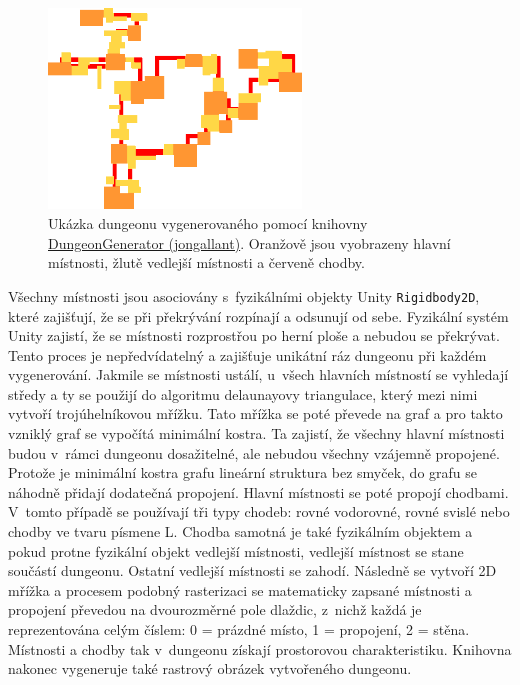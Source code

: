 \begin{figure}[t]
    \centering
    \includegraphics[width=0.6\textwidth]{obrazky/dunglib_jongallant.png}
    \caption{Ukázka dungeonu vygenerovaného pomocí knihovny \href{https://github.com/jongallant/DungeonGenerator}{DungeonGenerator (jongallant)}. Oranžově jsou vyobrazeny hlavní místnosti, žlutě vedlejší místnosti a červeně chodby.}
    \label{img:dunglib_jongallant}
\end{figure}
Všechny místnosti jsou asociovány s~fyzikálními objekty Unity \texttt{Rigidbody2D}, které zajišťují, že se při překrývání rozpínají a odsunují od sebe.
Fyzikální systém Unity zajistí, že se místnosti rozprostřou po herní ploše a nebudou se překrývat.
Tento proces je nepředvídatelný a zajišťuje unikátní ráz dungeonu při každém vygenerování.
Jakmile se místnosti ustálí, u~všech hlavních místností se vyhledají středy a ty se použijí do algoritmu delaunayovy triangulace, který mezi nimi vytvoří trojúhelníkovou mřížku.
Tato mřížka se poté převede na graf a pro takto vzniklý graf se vypočítá minimální kostra.
Ta zajistí, že všechny hlavní místnosti budou v~rámci dungeonu dosažitelné, ale nebudou všechny vzájemně propojené.
Protože je minimální kostra grafu lineární struktura bez smyček, do grafu se náhodně přidají dodatečná propojení.
Hlavní místnosti se poté propojí chodbami.
V~tomto případě se používají tři typy chodeb: rovné vodorovné, rovné svislé nebo chodby ve tvaru písmene L.
Chodba samotná je také fyzikálním objektem a pokud protne fyzikální objekt vedlejší místnosti, vedlejší místnost se stane součástí dungeonu.
Ostatní vedlejší místnosti se zahodí.
Následně se vytvoří 2D mřížka a procesem podobný rasterizaci se matematicky zapsané místnosti a propojení převedou na dvourozměrné pole dlaždic, z~nichž každá je reprezentována celým číslem: 0 = prázdné místo, 1 = propojení, 2 = stěna.
Místnosti a chodby tak v~dungeonu získají prostorovou charakteristiku.
Knihovna nakonec vygeneruje také rastrový obrázek vytvořeného dungeonu.
